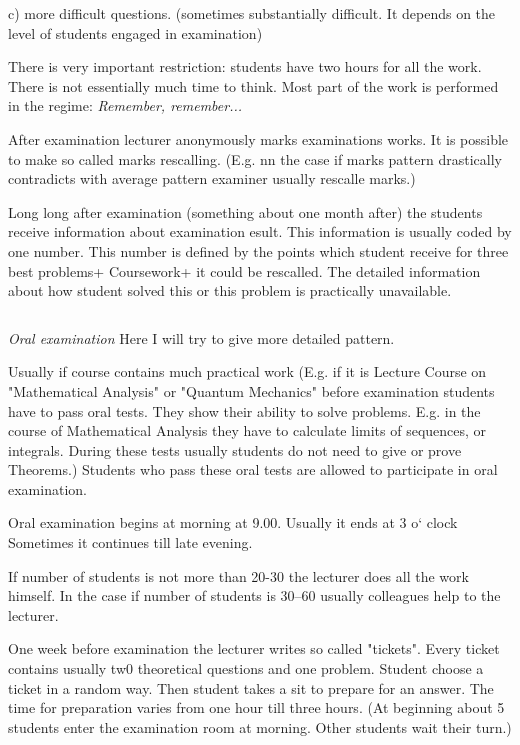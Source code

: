                  c) more difficult questions. (sometimes substantially difficult. It depends on the level of students
                  engaged in examination)


          There is very important restriction: students have two hours for all the work. There is not essentially
          much time to think. Most part of the work is performed in the regime: {\it Remember, remember... }


            After examination lecturer anonymously marks examinations works. It is possible to
            make so called marks rescalling. (E.g. nn the case if
           marks pattern drastically contradicts with average pattern examiner usually rescalle marks.)

           Long long after examination (something about one month after) the students receive information
           about examination esult. This information is usually coded by one number. This number is defined
           by the points which student receive for three best problems+ Coursework+
           it could be rescalled. The detailed information about how student solved this or this problem
           is practically unavailable.

     $$ $$

     {\it Oral examination} Here I will try to give more detailed pattern.


    Usually if course contains much practical work (E.g. if it is Lecture Course on "Mathematical Analysis"
      or "Quantum Mechanics" before examination students have to pass oral tests. They show their ability
        to solve problems. E.g. in the course of Mathematical Analysis they have to calculate limits of sequences,
        or integrals. During these tests usually students do not need to give or prove Theorems.)
        Students who pass these oral tests are allowed to participate in oral examination.

         Oral examination begins at morning at 9.00.
         Usually it ends at 3 o` clock Sometimes it continues till late evening.

  If number of students is not more than 20-30 the lecturer does all the work himself. In the case if number of students
  is 30--60 usually  colleagues help to the lecturer.

  One week before examination the lecturer writes so called "tickets". Every ticket contains
   usually tw0 theoretical questions and one problem. Student choose a ticket in a random way.
    Then student takes a sit to prepare for an answer. The time for preparation varies
     from one hour till three hours. (At beginning  about 5 students enter the examination room at morning.
     Other students wait their turn.)

